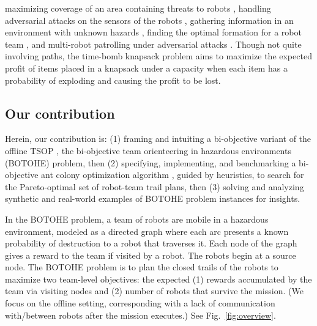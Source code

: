 \documentclass[fleqn,10pt,lineno]{wlpeerj}
\begin{document}
maximizing coverage of an area containing threats to robots \cite{korngut2023multi,yehoshua2016robotic}, 
handling adversarial attacks on the sensors of the robots \cite{liu2021distributed,zhou2022distributed,mayya2022adaptive,zhou2018resilient}, 
gathering information in an environment with unknown hazards \cite{schwager2017multi},
finding the optimal formation for a robot team \cite{shapira2015path},
and 
multi-robot patrolling under adversarial attacks \cite{huang2019survey}.
Though not quite involving paths, the time-bomb knapsack problem \cite{monaci2022exact} aims to maximize the expected profit of items placed in a knapsack under a capacity when each item has a probability of exploding and causing the profit to be lost.

\subsection{Our contribution}
Herein, our contribution is:
(1) framing and intuiting a bi-objective variant of the offline TSOP \cite{jorgensen2018team,jorgensen2017matroid,jorgensen2024matroid}, the bi-objective team orienteering in hazardous environments (BOTOHE) problem, then 
(2) specifying, implementing, and benchmarking a bi-objective ant colony optimization algorithm \cite{iredi2001bi}, guided by heuristics, to search for the Pareto-optimal set of robot-team trail plans, then
(3) solving and analyzing synthetic and real-world examples of BOTOHE problem instances for insights.

In the BOTOHE problem, 
a team of robots are mobile in a hazardous environment, modeled as a directed graph where each arc presents a known probability of destruction to a robot that traverses it.
Each node of the graph gives a reward to the team if visited by a robot.
The robots begin at a source node.
The BOTOHE problem is to plan the closed trails of the robots to maximize two team-level objectives: the expected
(1) rewards accumulated by the team via visiting nodes and
(2) number of robots that survive the mission. 
(We focus on the offline setting, corresponding with a lack of communication with/between robots after the mission executes.)
See Fig.~\ref{fig:overview}.
\end{document}
